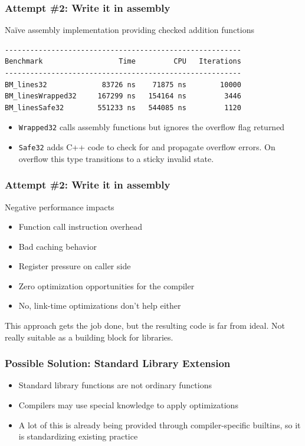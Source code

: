 \documentclass[aspectratio=169]{beamer}
\newif\iftransitions
\begin{document}
\begin{frame}[fragile]
  \frametitle{Attempt \#2: Write it in assembly}

  \iftransitions \pause \fi
  Naïve assembly implementation providing checked addition functions
  
  \begin{lstlisting}
--------------------------------------------------------
Benchmark                  Time         CPU   Iterations
--------------------------------------------------------
BM_lines32             83726 ns    71875 ns        10000
BM_linesWrapped32     167299 ns   154164 ns         3446
BM_linesSafe32        551233 ns   544085 ns         1120
  \end{lstlisting}
  
  \begin{itemize}
  \item \texttt{Wrapped32} calls assembly functions but ignores the overflow flag returned
  \item \texttt{Safe32} adds C++ code to check for and propagate overflow errors. On overflow this type transitions to a sticky invalid state.
  \end{itemize}

\end{frame}

\begin{frame}
  \frametitle{Attempt \#2: Write it in assembly}
  
  Negative performance impacts
  \begin{itemize}
  \item Function call instruction overhead  \iftransitions \pause \fi 
  \item Bad caching behavior  \iftransitions \pause \fi 
  \item Register pressure on caller side  \iftransitions \pause \fi 
  \item Zero optimization opportunities for the compiler  \iftransitions \pause \fi 
  \item No, link-time optimizations don't help either  \iftransitions \pause \fi 
  \end{itemize}
  
  \vspace{20pt}
  This approach gets the job done, but the resulting code is far from ideal.
  Not really suitable as a building block for libraries.
\end{frame}

\begin{frame}
  \frametitle{Possible Solution: Standard Library Extension}
  
  \begin{itemize}
  \item Standard library functions are not ordinary functions  \iftransitions \pause \fi 
  \item Compilers may use special knowledge to apply optimizations  \iftransitions \pause \fi 
  \item A lot of this is already being provided through compiler-specific builtins, so it is standardizing existing practice
  \end{itemize}
\end{frame}
\end{document}
